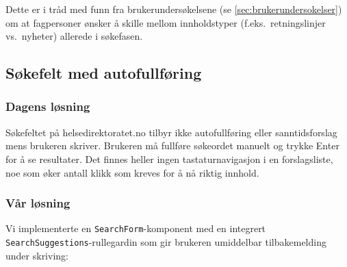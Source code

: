 Dette er i tråd med funn fra brukerundersøkelsene
(se \autoref{sec:brukerundersokelser}) om at fagpersoner ønsker å skille
mellom innholdstyper (f.eks.\ retningslinjer vs.\ nyheter) allerede i
søkefasen.

\subsection{Søkefelt med autofullføring}
\label{sec:autofullføring}

\subsubsection{Dagens løsning}
\label{sec:autofullføring-idag}


Søkefeltet på helsedirektoratet.no tilbyr ikke autofullføring eller
sanntidsforslag mens brukeren skriver. Brukeren må fullføre søkeordet
manuelt og trykke Enter for å se resultater. Det finnes heller ingen
tastaturnavigasjon i en forslagsliste, noe som øker antall klikk som
kreves for å nå riktig innhold.

\subsubsection{Vår løsning}
\label{sec:autofullføring-var}


Vi implementerte en \texttt{SearchForm}-komponent med en integrert
\texttt{SearchSuggestions}-rullegardin som gir brukeren umiddelbar
tilbakemelding under skriving:

